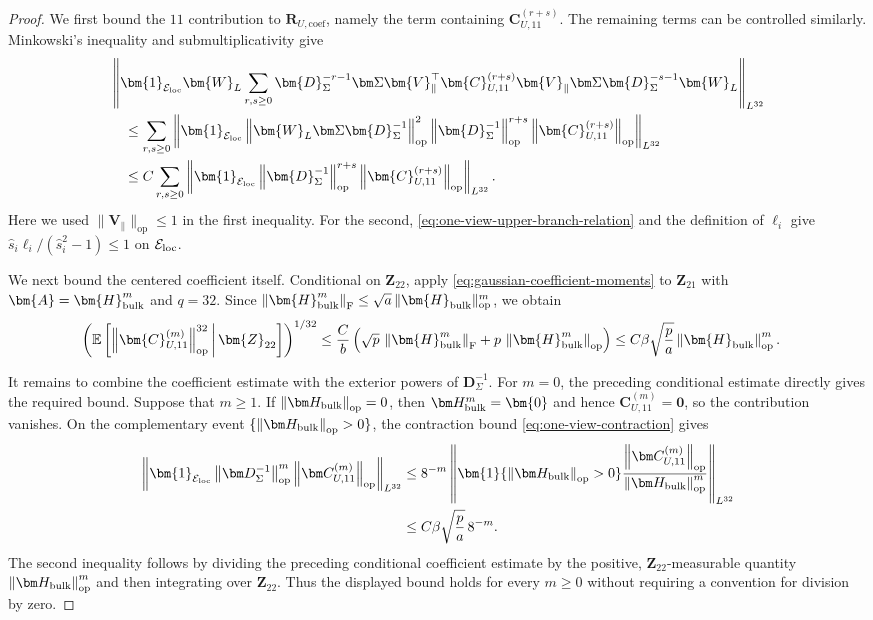 \documentclass[11pt]{article}
\newcommand{\E}{\mathbb{E}}
\newcommand{\ind}{\bm{1}}
\newcommand{\trans}{\top}
\newcommand{\opn}[1]{\left\lVert #1\right\rVert_{\mathrm{op}}}
\newcommand{\frn}[1]{\left\lVert #1\right\rVert_{\mathrm{F}}}
\newcommand{\Lqn}[2]{\left\lVert #1\right\rVert_{L^{#2}}}
\newcommand{\cE}{\mathcal{E}}
\newcommand{\bze}{\bm{0}}
\begin{document}
 
\begin{proof}


We first bound the $11$ contribution to
$\bm{R}_{U,\mathrm{coef}}$, namely the term containing
$\bm{C}_{U,11}^{(r+s)}$. 
The remaining terms can be controlled similarly. 
Minkowski's inequality and submultiplicativity
give
\begin{align*}
&\Lqn{
  \ind_{\cE_{\rm loc}}\bm{W}_L
  \sum_{r,s\ge0}
  \bm{D}_\Sigma^{-r-1}\bm\Sigma\bm{V}_\parallel^\trans
  \bm{C}_{U,11}^{(r+s)}
  \bm{V}_\parallel\bm\Sigma\bm{D}_\Sigma^{-s-1}
  \bm{W}_L
}{32}\\
&\quad\le
\sum_{r,s\ge0}
\left\|
  \ind_{\cE_{\rm loc}}
  \opn{\bm{W}_L\bm\Sigma\bm{D}_\Sigma^{-1}}^2
  \opn{\bm{D}_\Sigma^{-1}}^{r+s}
  \opn{\bm{C}_{U,11}^{(r+s)}}
\right\|_{L^{32}}\\
&\quad\le
C\sum_{r,s\ge0}
\left\|
  \ind_{\cE_{\rm loc}}
  \opn{\bm{D}_\Sigma^{-1}}^{r+s}
  \opn{\bm{C}_{U,11}^{(r+s)}}
\right\|_{L^{32}}.
\end{align*}
Here we used $\|\bm V_\parallel\|_{\mathrm{op}}\le1$ in the first
inequality.  For the second, \cref{eq:one-view-upper-branch-relation} and
the definition of $\ell_i$ give
$\widehat s_i\ell_i/(\widehat s_i^2-1)\le1$ on $\cE_{\rm loc}$.


We next bound the centered coefficient itself.  Conditional on
$\bm{Z}_{22}$, apply
\cref{eq:gaussian-coefficient-moments} to $\bm{Z}_{21}$ with
$\bm{A}=\bm{H}_{\rm bulk}^m$ and $q=32$.  Since
$\frn{\bm{H}_{\rm bulk}^m}\le\sqrt a\,\|\bm{H}_{\rm bulk}\|_{\mathrm{op}}^m$, we obtain
\begin{align*}
\left(
  \E\left[
    \opn{\bm{C}_{U,11}^{(m)}}^{32}
    \,\middle|\,\bm{Z}_{22}
  \right]
\right)^{1/32}
&\le
\frac{C}{b}
\left(
  \sqrt p\,\frn{\bm{H}_{\rm bulk}^m}
  +p\,\opn{\bm{H}_{\rm bulk}^m}
\right)\le
C\beta \sqrt{\frac{p}{a}}\opn{\bm{H}_{\rm bulk}}^m.
\end{align*}


It remains to combine the coefficient estimate with the exterior powers of
$\bm D_\Sigma^{-1}$. For $m=0$, the preceding conditional estimate directly
gives the required bound. Suppose that $m\ge1$. If
$\opn{\bm H_{\rm bulk}}=0$, then $\bm H_{\rm bulk}^m=\bze$ and hence
$\bm C_{U,11}^{(m)}=\bze$, so the contribution vanishes. On the complementary
event $\{\opn{\bm H_{\rm bulk}}>0\}$, the contraction bound
\cref{eq:one-view-contraction} gives
\[
\begin{aligned}
  \left\|
    \ind_{\cE_{\rm loc}}
    \opn{\bm D_\Sigma^{-1}}^m
    \opn{\bm C_{U,11}^{(m)}}
  \right\|_{L^{32}}
  &\le
  8^{-m}
  \left\|
    \ind\{\opn{\bm H_{\rm bulk}}>0\}
    \frac{\opn{\bm C_{U,11}^{(m)}}}
         {\opn{\bm H_{\rm bulk}}^m}
  \right\|_{L^{32}} \\
  &\le
  C\beta \sqrt{\frac{p}{a}}\,8^{-m}.
\end{aligned}
\]
The second inequality follows by dividing the preceding conditional
coefficient estimate by the positive, $\bm Z_{22}$-measurable quantity
$\opn{\bm H_{\rm bulk}}^m$ and then integrating over $\bm Z_{22}$. Thus the
displayed bound holds for every $m\ge0$ without requiring a convention for
division by zero.



\end{proof}
\end{document}
